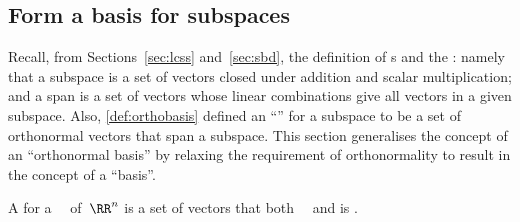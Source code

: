 \subsection{Form a basis for subspaces}


Recall, from Sections~\ref{sec:lcss} and~\ref{sec:sbd}, the definition of s and the : namely that a subspace is a set of vectors closed under addition and scalar multiplication; and a span is a set of vectors whose linear combinations give all vectors in a given subspace.
Also, \autoref{def:orthobasis} defined an ``'' for a subspace to be a set of orthonormal vectors that span a subspace.
This section generalises the concept of an ``orthonormal basis'' by relaxing the requirement of orthonormality to result in the concept of a ``basis''.


\begin{definition} \label{def:basis} 
A  for a ~\WW\ of~\(\RR^n\) is a set of  vectors that both ~\WW\ and is .
\end{definition}

